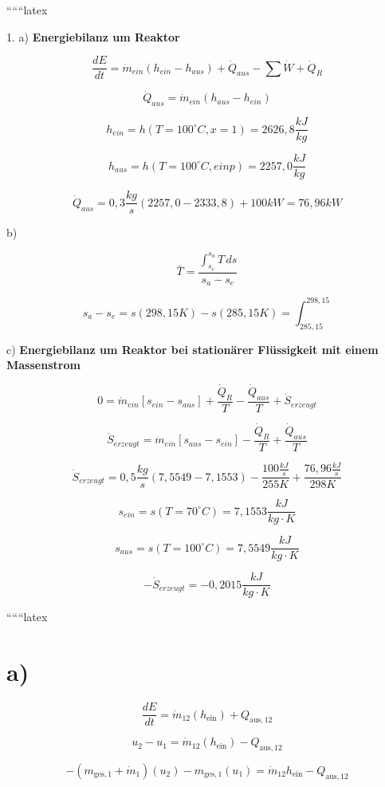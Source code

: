 
``````latex


1. a) \textbf{Energiebilanz um Reaktor}

\[
\frac{dE}{dt} = \dot{m}_{ein}(h_{ein} - h_{aus}) + \dot{Q}_{aus} - \sum \dot{W} + \dot{Q}_R
\]

\[
\dot{Q}_{aus} = \dot{m}_{ein}(h_{aus} - h_{ein})
\]

\[
h_{ein} = h(T=100^\circ C, x=1) = 2626,8 \frac{kJ}{kg}
\]

\[
h_{aus} = h(T=100^\circ C, einp) = 2257,0 \frac{kJ}{kg}
\]

\[
\dot{Q}_{aus} = 0,3 \frac{kg}{s} (2257,0 - 2333,8) + 100 kW = 76,96 kW
\]

b)

\[
\bar{T} = \frac{\int_{s_e}^{s_a} T \, ds}{s_a - s_e}
\]

\[
s_a - s_e = s(298,15 K) - s(285,15 K) = \int_{285,15}^{298,15}
\]

c) \textbf{Energiebilanz um Reaktor bei stationärer Flüssigkeit mit einem Massenstrom}

\[
0 = \dot{m}_{ein} [s_{ein} - s_{aus}] + \frac{\dot{Q}_R}{T} - \frac{\dot{Q}_{aus}}{T} + \dot{S}_{erzeugt}
\]

\[
\dot{S}_{erzeugt} = \dot{m}_{ein} [s_{aus} - s_{ein}] - \frac{\dot{Q}_R}{T} + \frac{\dot{Q}_{aus}}{T}
\]

\[
\dot{S}_{erzeugt} = 0,5 \frac{kg}{s} (7,5549 - 7,1553) - \frac{100 \frac{kJ}{s}}{255 K} + \frac{76,96 \frac{kJ}{s}}{298 K}
\]

\[
s_{ein} = s(T=70^\circ C) = 7,1553 \frac{kJ}{kg \cdot K}
\]

\[
s_{aus} = s(T=100^\circ C) = 7,5549 \frac{kJ}{kg \cdot K}
\]

\[
-\dot{S}_{erzeugt} = -0,2015 \frac{kJ}{kg \cdot K}
\]

``````latex


\section*{a)}

\begin{equation*}
\frac{dE}{dt} = \dot{m}_{12} (h_{\text{ein}}) + Q_{\text{aus},12}
\end{equation*}

\begin{equation*}
u_2 - u_1 = \dot{m}_{12} (h_{\text{ein}}) - Q_{\text{aus},12}
\end{equation*}

\begin{equation*}
-(m_{\text{ges},1} + \dot{m}_1) (u_2) - m_{\text{ges},1} (u_1) = \dot{m}_{12} h_{\text{ein}} - Q_{\text{aus},12}
\end{equation*}

